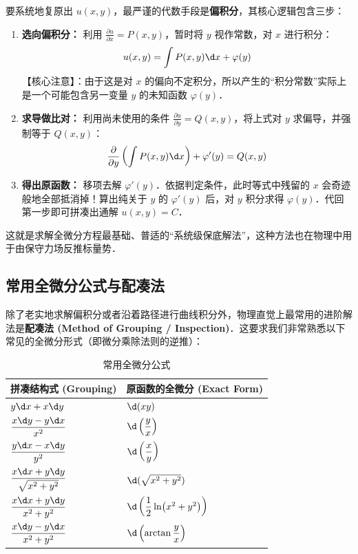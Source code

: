 \documentclass[12pt, a4paper, oneside, UTF8]{ctexbook}
\begin{document}
要系统地复原出 $u(x,y)$，最严谨的代数手段是\textbf{偏积分}，其核心逻辑包含三步：
\begin{enumerate}
    \item \textbf{选向偏积分：} 利用 $\frac{\partial u}{\partial x} = P(x,y)$，暂时将 $y$ 视作常数，对 $x$ 进行积分：
    \[ u(x,y) = \int P(x,y) \d x + \varphi(y) \]
    【核心注意】：由于这是对 $x$ 的偏向不定积分，所以产生的“积分常数”实际上是一个可能包含另一变量 $y$ 的未知函数 $\varphi(y)$．
    \item \textbf{求导做比对：} 利用尚未使用的条件 $\frac{\partial u}{\partial y} = Q(x,y)$，将上式对 $y$ 求偏导，并强制等于 $Q(x,y)$：
    \[ \frac{\partial}{\partial y} \left( \int P(x,y) \d x \right) + \varphi'(y) = Q(x,y) \]
    \item \textbf{得出原函数：} 移项去解 $\varphi'(y)$．依据判定条件，此时等式中残留的 $x$ 会奇迹般地全部抵消掉！算出纯关于 $y$ 的 $\varphi'(y)$ 后，对 $y$ 积分求得 $\varphi(y)$．代回第一步即可拼凑出通解 $u(x,y) = C$．
\end{enumerate}
这就是求解全微分方程最基础、普适的“系统级保底解法”，这种方法也在物理中用于由保守力场反推标量势．

\subsection{常用全微分公式与配凑法}
除了老实地求解偏积分或者沿着路径进行曲线积分外，物理直觉上最常用的进阶解法是\textbf{配凑法 (Method of Grouping / Inspection)}．这要求我们非常熟悉以下常见的全微分形式（即微分乘除法则的逆推）：

\begin{table}[H]
    \centering
    \caption{常用全微分公式}
    \renewcommand\arraystretch{1.8}
    \begin{tabular}{ll}
        \hline
        \textbf{拼凑结构式 (Grouping)} & \textbf{原函数的全微分 (Exact Form)} \\
        \hline
        $y \d x + x \d y$ & $\d(xy)$ \\
        $\dfrac{x \d y - y \d x}{x^2}$ & $\d\left(\dfrac{y}{x}\right)$ \\
        $\dfrac{y \d x - x \d y}{y^2}$ & $\d\left(\dfrac{x}{y}\right)$ \\
        $\dfrac{x \d x + y \d y}{\sqrt{x^2+y^2}}$ & $\d(\sqrt{x^2+y^2})$ \\
        $\dfrac{x \d x + y \d y}{x^2+y^2}$ & $\d\left(\dfrac{1}{2}\ln(x^2+y^2)\right)$ \\
        $\dfrac{x \d y - y \d x}{x^2+y^2}$ & $\d\left(\arctan\dfrac{y}{x}\right)$ \\
        \hline
    \end{tabular}
\end{table}
\end{document}
